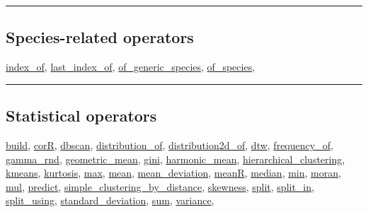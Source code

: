 \documentclass[]{book}
\theoremstyle{definition}
\theoremstyle{definition}
\theoremstyle{definition}
\theoremstyle{remark}
\begin{document}
\begin{center}\rule{0.5\linewidth}{\linethickness}\end{center}

\subsection{Species-related operators}\label{species-related-operators}

\href{operators-i-to-m.html\#index_of}{index\_of},
\href{operators-i-to-m.html\#last_index_of}{last\_index\_of},
\href{operators-n-to-r.html\#of_generic_species}{of\_generic\_species},
\href{operators-n-to-r.html\#of_species}{of\_species},

\begin{center}\rule{0.5\linewidth}{\linethickness}\end{center}

\subsection{Statistical operators}\label{statistical-operators}

\href{operators-b-to-c.html\#build}{build},
\href{operators-b-to-c.html\#corr}{corR},
\href{operators-d-to-h.html\#dbscan}{dbscan},
\href{operators-d-to-h.html\#distribution_of}{distribution\_of},
\href{operators-d-to-h.html\#distribution2d_of}{distribution2d\_of},
\href{operators-d-to-h.html\#dtw}{dtw},
\href{operators-d-to-h.html\#frequency_of}{frequency\_of},
\href{operators-d-to-h.html\#gamma_rnd}{gamma\_rnd},
\href{operators-d-to-h.html\#geometric_mean}{geometric\_mean},
\href{operators-d-to-h.html\#gini}{gini},
\href{operators-d-to-h.html\#harmonic_mean}{harmonic\_mean},
\href{operators-d-to-h.html\#hierarchical_clustering}{hierarchical\_clustering},
\href{operators-i-to-m.html\#kmeans}{kmeans},
\href{operators-i-to-m.html\#kurtosis}{kurtosis},
\href{operators-i-to-m.html\#max}{max},
\href{operators-i-to-m.html\#mean}{mean},
\href{operators-i-to-m.html\#mean_deviation}{mean\_deviation},
\href{operators-i-to-m.html\#meanr}{meanR},
\href{operators-i-to-m.html\#median}{median},
\href{operators-i-to-m.html\#min}{min},
\href{operators-i-to-m.html\#moran}{moran},
\href{operators-i-to-m.html\#mul}{mul},
\href{operators-n-to-r.html\#predict}{predict},
\href{operators-s-to-z.html\#simple_clustering_by_distance}{simple\_clustering\_by\_distance},
\href{operators-s-to-z.html\#skewness}{skewness},
\href{operators-s-to-z.html\#split}{split},
\href{operators-s-to-z.html\#split_in}{split\_in},
\href{operators-s-to-z.html\#split_using}{split\_using},
\href{operators-s-to-z.html\#standard_deviation}{standard\_deviation},
\href{operators-s-to-z.html\#sum}{sum},
\href{operators-s-to-z.html\#variance}{variance},
\end{document}
